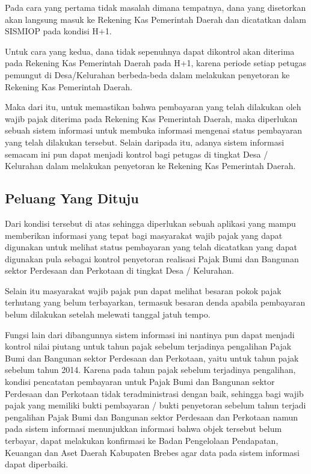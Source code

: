 \documentclass[pdftex,12pt, oneside]{article}
\begin{document}
Pada cara yang pertama tidak masalah dimana tempatnya, dana yang disetorkan akan langsung masuk ke Rekening Kas Pemerintah Daerah dan dicatatkan dalam SISMIOP pada kondisi H+1.

Untuk cara yang kedua, dana tidak sepenuhnya dapat dikontrol akan diterima pada Rekening Kas Pemerintah Daerah pada H+1, karena periode setiap petugas pemungut di Desa/Kelurahan berbeda-beda dalam melakukan penyetoran ke Rekening Kas Pemerintah Daerah. 

Maka dari itu, untuk memastikan bahwa pembayaran yang telah dilakukan oleh wajib pajak diterima pada Rekening Kas Pemerintah Daerah, maka diperlukan sebuah sistem informasi untuk membuka informasi mengenai status pembayaran yang telah dilakukan tersebut. Selain daripada itu, adanya sistem informasi semacam ini pun dapat menjadi kontrol bagi petugas di tingkat Desa / Kelurahan dalam melakukan penyetoran ke Rekening Kas Pemerintah Daerah.

\subsection{Peluang Yang Dituju}

Dari kondisi tersebut di atas sehingga diperlukan sebuah aplikasi yang mampu memberikan informasi yang tepat bagi masyarakat wajib pajak yang dapat digunakan untuk melihat status pembayaran yang telah dicatatkan yang dapat digunakan pula sebagai kontrol penyetoran realisasi Pajak Bumi dan Bangunan sektor Perdesaan dan Perkotaan di tingkat Desa / Kelurahan.

Selain itu masyarakat wajib pajak pun dapat melihat besaran pokok pajak terhutang yang belum terbayarkan, termasuk besaran denda apabila pembayaran belum dilakukan setelah melewati tanggal jatuh tempo.

Fungsi lain dari dibangunnya sistem informasi ini nantinya pun dapat menjadi kontrol nilai piutang untuk tahun pajak sebelum terjadinya pengalihan Pajak Bumi dan Bangunan sektor Perdesaan dan Perkotaan, yaitu untuk tahun pajak sebelum tahun 2014. Karena pada tahun pajak sebelum terjadinya pengalihan, kondisi pencatatan pembayaran untuk Pajak Bumi dan Bangunan sektor Perdesaan dan Perkotaan tidak teradministrasi dengan baik, sehingga bagi wajib pajak yang memiliki bukti pembayaran / bukti penyetoran sebelum tahun terjadi pengalihan Pajak Bumi dan Bangunan sektor Perdesaan dan Perkotaan namun pada sistem informasi menunjukkan informasi bahwa objek tersebut belum terbayar, dapat melakukan konfirmasi ke Badan Pengelolaan Pendapatan, Keuangan dan Aset Daerah Kabupaten Brebes agar data pada sistem informasi dapat diperbaiki.
\end{document}
